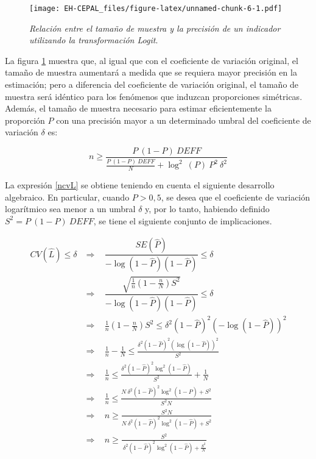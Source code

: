 \documentclass[12pt,spanish,]{book}
\begin{document}
\begin{figure}
\centering
\texttt{[image: EH-CEPAL\_files/figure-latex/unnamed-chunk-6-1.pdf]}
\caption{\label{fig:unnamed-chunk-6}\label{fig1}\emph{Relación entre el tamaño de muestra y la precisión de un indicador utilizando la transformación Logit}.}
\end{figure}

La figura \ref{fig1} muestra que, al igual que con el coeficiente de variación original, el tamaño de muestra aumentará a medida que se requiera mayor precisión en la estimación; pero a diferencia del coeficiente de variación original, el tamaño de muestra será idéntico para los fenómenos que induzcan proporciones simétricas. Además, el tamaño de muestra necesario para estimar eficientemente la proporción \(P\) con una precisión mayor a un determinado umbral del coeficiente de variación \(\delta\) es:

\begin{equation}
\label{ncvL}
n \geq \dfrac{P \ (1-P) \  DEFF}{\frac{P \  (1-P) \ DEFF}{N}+\log^2\ (P) \ P^2 \ \delta^2}
\end{equation}

La expresión \eqref{ncvL} se obtiene teniendo en cuenta el siguiente desarrollo algebraico. En particular, cuando \(P > 0,5\), se desea que el coeficiente de variación logarítmico sea menor a un umbral \(\delta\) y, por lo tanto, habiendo definido \(S^2 = P\ (1-P) \  DEFF\), se tiene el siguiente conjunto de implicaciones.

\begin{align*}
CV(\hat{L}) \leq \delta 
&\Longrightarrow \ \ \ \ \dfrac{SE(\hat{P})}{-\log(1-\hat{P})(1-\hat{P})} \leq \delta \\
&\Longrightarrow \ \ \ \ \dfrac{\sqrt{\frac{1}{n}(1-\frac{n}{N})S^2}}{-\log (1-\hat{P})(1-\hat{P})} \leq \delta \\
&\Longrightarrow \ \ \ \ 
\frac{1}{n}(1-\frac{n}{N})S^2 \leq \delta^2 (1-\hat{P})^2(-\log (1-\hat{P}))^2 \\ 
&\Longrightarrow \ \ \ \ 
\frac{1}{n}-\frac{1}{N} \leq \frac{\delta^2 (1-\hat{P})^2(\log (1-\hat{P}))^2}{S^2} \\
&\Longrightarrow \ \ \ \ 
\frac{1}{n} \leq \frac{\delta^2 (1-\hat{P})^2\log^2(1-\hat{P})}{S^2} + \frac{1}{N} \\ 
&\Longrightarrow \ \ \ \ 
\frac{1}{n} \leq \frac{N\ \delta^2(1-\hat{P})^2\log^2(1-\hat{P}) +S^2}{S^2N} \\
&\Longrightarrow \ \ \ \ 
n \geq \frac{S^2N}{N\ \delta^2(1-\hat{P})^2\log^2(1-\hat{P}) +S^2} \\
&\Longrightarrow \ \ \ \ 
n \geq \frac{S^2}{\ \delta^2(1-\hat{P})^2\log^2(1-\hat{P}) +\frac{S^2}{N}}
\end{align*}
\end{document}

